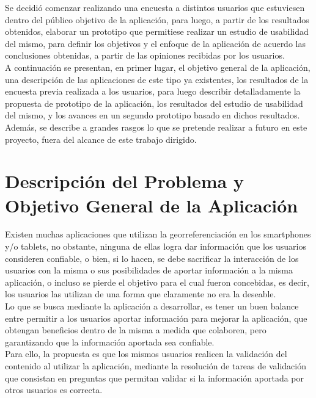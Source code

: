 \documentclass[10pt,letterpaper]{article}
\begin{document}
Se decidió comenzar realizando una encuesta a distintos usuarios que estuviesen dentro del público objetivo de la aplicación, para luego, a partir de los resultados obtenidos, elaborar un prototipo que permitiese realizar un estudio de usabilidad del mismo, para definir los objetivos y el enfoque de la aplicación de acuerdo las conclusiones obtenidas, a partir de las opiniones recibidas por los usuarios.\\

A continuación se presentan, en primer lugar, el objetivo general de la aplicación, una descripción de las aplicaciones de este tipo ya existentes, los resultados de la encuesta previa realizada a los usuarios, para luego describir detalladamente la propuesta de prototipo de la aplicación, los resultados del estudio de usabilidad del mismo, y los avances en un segundo prototipo basado en dichos resultados. Además, se describe a grandes rasgos lo que se pretende realizar a futuro en este proyecto, fuera del alcance de este trabajo dirigido.\\

\newpage
\section{Descripción del Problema y Objetivo General de la Aplicación}

Existen muchas aplicaciones que utilizan la georreferenciación en los smartphones y/o tablets, no obstante, ninguna de ellas logra dar información que los usuarios consideren confiable, o bien, si lo hacen, se debe sacrificar la interacción de los usuarios con la misma o sus posibilidades de aportar información a la misma aplicación, o incluso se pierde el objetivo para el cual fueron concebidas, es decir, los usuarios las utilizan de una forma que claramente no era la deseable.\\

Lo que se busca mediante la aplicación a desarrollar, es tener un buen balance entre permitir a los usuarios aportar información para mejorar la aplicación, que obtengan beneficios dentro de la misma a medida que colaboren, pero garantizando que la información aportada sea confiable.\\

Para ello, la propuesta es que los mismos usuarios realicen la validación del contenido al utilizar la aplicación, mediante la resolución de tareas de validación que consistan en preguntas que permitan validar si la información aportada por otros usuarios es correcta.\\
\end{document}
